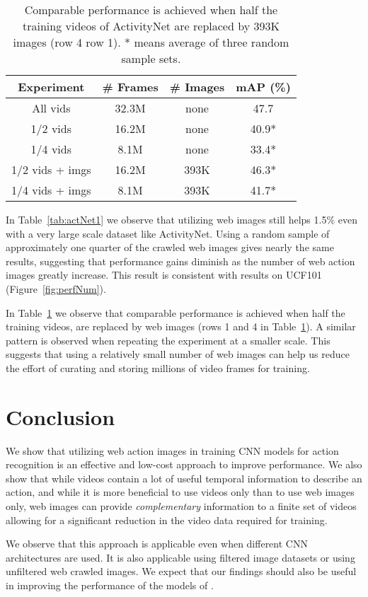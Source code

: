 \documentclass[10pt,twocolumn,letterpaper]{article}
\begin{document}
\begin{table} [t]
\centering
\caption{Comparable performance is achieved when half the training videos of ActivityNet are replaced by 393K images (row 4 \vs row 1). * {\footnotesize means average of three random sample sets.} }
\label{tab:actNet2}
\begin{tabular}{c c c c}
\hline \hline
Experiment        & \# Frames & \# Images &  mAP (\%) \\  \hline 
All vids          & 32.3M     & none      & 47.7 \\
1/2 vids          & 16.2M     & none      & { }{ }40.9* \\ 
1/4 vids          & 8.1M      & none	  & { }{ }33.4* \\
1/2 vids + imgs	  & 16.2M     & 393K      & { }{ }46.3* \\
1/4 vids + imgs	  & 8.1M      & 393K      & { }{ }41.7* \\
\hline \hline
\end{tabular}
\end{table}

In Table~\ref{tab:actNet1} we observe that utilizing web images still helps 1.5\% even with a very large scale dataset like ActivityNet. Using a random sample of approximately one quarter of the crawled web images gives nearly the same results, suggesting that performance gains diminish as the number of web action images greatly increase. This result is consistent with results on UCF101 (Figure~\ref{fig:perfNum}).

In Table~\ref{tab:actNet2} we observe that comparable performance is achieved when half the training videos, are replaced by web images (rows 1 and 4 in Table~\ref{tab:actNet2}). A similar pattern is observed when repeating the experiment at a smaller scale. This suggests that using a relatively small number of web images can help us reduce the effort of curating and storing millions of video frames for training.





\section{Conclusion}

We show that utilizing web action images in training CNN models for action recognition is an effective and low-cost approach to improve performance. We also show that while videos contain a lot of useful temporal information to describe an action, and while it is more beneficial to use videos only than to use web images only, web images can provide {\em complementary} information to a finite set of videos allowing for a significant reduction in the video data required for training.



We observe that this approach is applicable even when different CNN architectures are used. It is also applicable using filtered image datasets or using unfiltered web crawled images. We expect that our findings should also be useful in improving the performance of the models of \cite{ng2015beyond, simonyan2014two}. 



{\small


}
\end{document}
